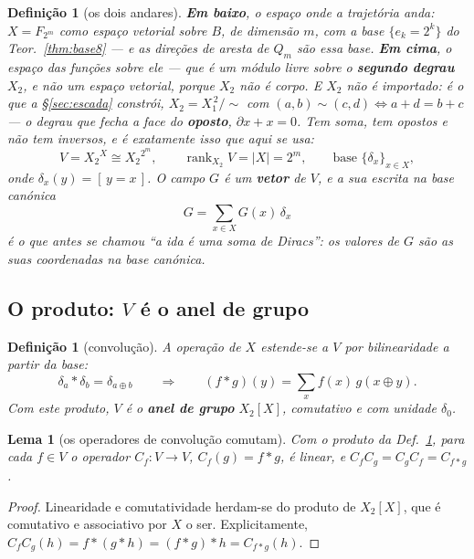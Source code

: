 \documentclass[11pt,a4paper]{article}
\newcommand{\abs}[1]{\lvert #1\rvert}
\newcommand{\Zc}{\ensuremath{X_2}}
\newtheorem{lema}[teorema]{Lema}
\newtheorem{definicao}[teorema]{Definição}
\begin{document}
\begin{definicao}[os dois andares]\label{def:doisandares}
\textbf{Em baixo}, o espaço onde a trajetória anda: $X=F_{2^m}$ como espaço
vetorial sobre $B$, de dimensão $m$, com a base $\{e_k=2^{k}\}$ do
Teor.~\ref{thm:base8} --- e as direções de aresta de $Q_m$ \emph{são} essa base.
\textbf{Em cima}, o espaço das funções sobre ele --- que é um \emph{módulo
livre} sobre o \textbf{segundo degrau} $X_2$, e não um espaço vetorial, porque
$X_2$ não é corpo. \emph{E $X_2$ não é importado}: é o que a §\ref{sec:escada}
constrói, $X_2=X_1^{\,2}/{\sim}$ com $(a,b)\sim(c,d)\iff a+d=b+c$ --- o degrau
que fecha a face do \textbf{oposto}, $\partial x+x=0$. Tem soma, tem opostos e
não tem inversos, e é exatamente isso que aqui se usa:
\[
V=\Zc^{X}\cong\Zc^{2^{m}},\qquad \operatorname{rank}_{\Zc}V=\abs{X}=2^{m},
\qquad \text{base } \{\delta_x\}_{x\in X},
\]
onde $\delta_x(y)=[\,y=x\,]$. O campo $G$ é um \textbf{vetor} de $V$, e a sua
escrita na base canónica
\[
G=\sum_{x\in X}G(x)\,\delta_x
\]
é o que antes se chamou ``a ida é uma soma de Diracs'': os valores de $G$
\emph{são} as suas coordenadas na base canónica.
\end{definicao}

\subsection*{O produto: $V$ é o anel de grupo}

\begin{definicao}[convolução]\label{def:conv}
A operação de $X$ estende-se a $V$ por bilinearidade a partir da base:
\[
\delta_a*\delta_b=\delta_{a\oplus b}
\qquad\Longrightarrow\qquad
(f*g)(y)=\sum_{x}f(x)\,g(x\oplus y).
\]
Com este produto, $V$ é o \textbf{anel de grupo} $\Zc[X]$, comutativo e com
unidade $\delta_0$.
\end{definicao}

\begin{lema}[os operadores de convolução comutam]\label{lem:comuta}
Com o produto da Def.~\ref{def:conv}, para cada $f\in V$ o operador
$C_f\colon V\to V$, $C_f(g)=f*g$, é linear, e
$C_fC_g=C_gC_f=C_{f*g}$.
\end{lema}

\begin{proof}
Linearidade e comutatividade herdam-se do produto de $\Zc[X]$, que é comutativo e
associativo por $X$ o ser. Explicitamente, $C_f C_g(h)=f*(g*h)=(f*g)*h=C_{f*g}(h)$.
\end{proof}
\end{document}
